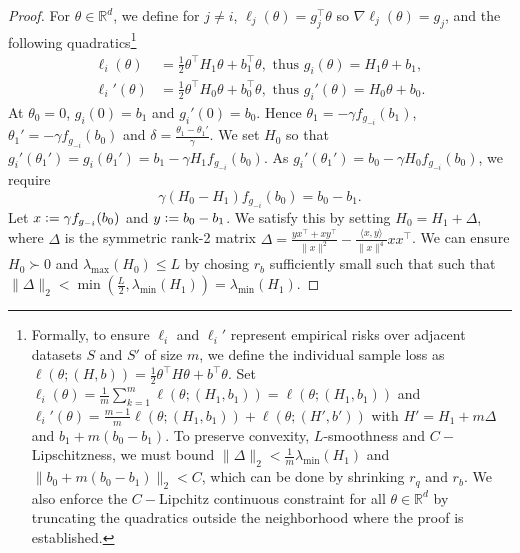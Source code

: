 \documentclass[twoside,11pt]{article}
\newcommand{\R}{\mathbb{R}}
\begin{document}
\begin{proof}
    For $\theta \in \R^d$, we define for $j \neq i$, $\ell_j(\theta) = g_j^\intercal \theta$ so $\nabla \ell_j(\theta) = g_j$, and the following quadratics\footnote{
        Formally, to ensure $\ell_i$ and $\ell_i'$ represent empirical risks over adjacent datasets $S$ and $S'$ of size $m$, we define the individual sample loss as $\ell(\theta; (H, b)) = \frac{1}{2}\theta^\intercal H \theta + b^\intercal \theta$. 
        Set $\ell_i(\theta) = \frac{1}{m} \sum_{k=1}^{m} \ell(\theta; (H_1, b_1)) = \ell(\theta; (H_1, b_1)) $ and $\ell_i'(\theta) = \frac{m-1}{m} \ell(\theta; (H_1, b_1)) + \ell(\theta; (H', b'))$ with $H' = H_1 + m\Delta$ and $b_1 + m(b_0 - b_1)$. 
        To preserve convexity, $L$-smoothness and $C-$Lipschitzness, we must bound $\|\Delta\|_2 < \frac{1}{m}\lambda_{\min}(H_1)$ and $\|b_0 + m(b_0-b_1)\|_2 < C$, which can be done by shrinking $r_q$ and $r_b$.
        We also enforce the $C-$Lipchitz continuous constraint for all $\theta \in \R^d$ by truncating the quadratics outside the neighborhood where the proof is established.}
    \begin{align*}
        \ell_i(\theta) &= \frac{1}{2} \theta^\intercal H_1 \theta + b_1^\intercal \theta, \text{ thus } g_i(\theta) = H_1 \theta + b_1,\\
        \ell_i'(\theta) &= \frac{1}{2} \theta^\intercal H_0 \theta + b_0^\intercal \theta, \text{ thus } g_i'(\theta) = H_0 \theta + b_0.
    \end{align*}
    At $\theta_0 = 0$, $g_i(0) = b_1$ and $g_i'(0) = b_0$. 
    Hence $\theta_1 = -\gamma f_{g_{-i}}(b_1)$, $\theta_1' = -\gamma f_{g_{-i}}(b_0)$ and $\delta = \frac{\theta_1 - \theta_1'}{\gamma}$.
    We set $H_0$ so that $g_i'(\theta_1') = g_i(\theta_1') = b_1 - \gamma H_1 f_{g_{-i}}(b_0)$. 
    As $g_i'(\theta_1') = b_0 - \gamma H_0 f_{g_{-i}}(b_0)$, we require
    \begin{equation*}
        \gamma (H_0 - H_1) f_{g_{-i}}(b_0) = b_0 - b_1.
    \end{equation*}
    Let $x \vcentcolon= \gamma f_{g_{-i}}(b_0)$ and $y \vcentcolon= b_0 - b_1$. 
    We satisfy this by setting $H_0 = H_1 + \Delta$, where $\Delta$ is the symmetric rank-2 matrix $\Delta = \frac{y x^\intercal + x y^\intercal}{\|x\|^2} - \frac{\langle x, y \rangle}{\|x\|^4} x x^\intercal$. 
    We can ensure $H_0 \succ 0$ and $\lambda_{\max}(H_0) \leq L$ by chosing $r_b$ sufficiently small such that such that $\|\Delta\|_2 < \min\left(\frac{L}{2}, \lambda_{\min}(H_1)\right) = \lambda_{\min}(H_1)$. 


\end{proof}
\end{document}
